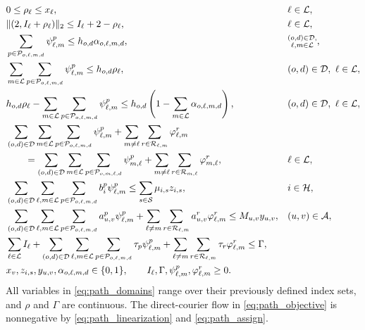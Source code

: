\documentclass[final,3p,authoryear]{elsarticle}
\begin{document}
\begin{subequations}
\begin{align}
 &0\le\rho_\ell\le x_\ell,
 &&\ell\in\mathcal L,\label{eq:path_rho}\\
 &\|(2,I_\ell+\rho_\ell)\|_2\le I_\ell+2-\rho_\ell,
 &&\ell\in\mathcal L,\label{eq:path_full_cone}\\
 &\sum_{p\in\mathcal P_{o,\ell,m,d}}\psi_{\ell,m}^{p}
 \le h_{o,d}\alpha_{o,\ell,m,d},
 &&\substack{(o,d)\in\mathcal D,\\\ell,m\in\mathcal L},\label{eq:path_full_pair}\\
 &\sum_{m\in\mathcal L}\sum_{p\in\mathcal P_{o,\ell,m,d}}\psi_{\ell,m}^{p}
 \le h_{o,d}\rho_\ell,
 &&(o,d)\in\mathcal D,\ \ell\in\mathcal L,\label{eq:path_full_source_upper}\\
 &h_{o,d}\rho_\ell-
 \sum_{m\in\mathcal L}\sum_{p\in\mathcal P_{o,\ell,m,d}}\psi_{\ell,m}^{p}
 \le h_{o,d}\left(1-\sum_{m\in\mathcal L}\alpha_{o,\ell,m,d}\right),
 &&(o,d)\in\mathcal D,\ \ell\in\mathcal L,\label{eq:path_full_source_lower}\\
 &\sum_{(o,d)\in\mathcal D}\sum_{m\in\mathcal L}
  \sum_{p\in\mathcal P_{o,\ell,m,d}}\psi_{\ell,m}^{p}
 +\sum_{m\ne\ell}\sum_{r\in\mathcal R_{\ell,m}}\varphi_{\ell,m}^{r}\notag\\
 &\qquad=\sum_{(o,d)\in\mathcal D}\sum_{m\in\mathcal L}
  \sum_{p\in\mathcal P_{o,m,\ell,d}}\psi_{m,\ell}^{p}
 +\sum_{m\ne\ell}\sum_{r\in\mathcal R_{m,\ell}}\varphi_{m,\ell}^{r},
 &&\ell\in\mathcal L,\label{eq:path_balance}\\
 &\sum_{(o,d)\in\mathcal D}\sum_{\ell,m\in\mathcal L}
  \sum_{p\in\mathcal P_{o,\ell,m,d}}b_i^p\psi_{\ell,m}^{p}
 \le\sum_{s\in\mathcal S}\mu_{i,s}z_{i,s},
 &&i\in\mathcal H,\label{eq:path_capacity}\\
 &\sum_{(o,d)\in\mathcal D}\sum_{\ell,m\in\mathcal L}
  \sum_{p\in\mathcal P_{o,\ell,m,d}}a_{u,v}^p\psi_{\ell,m}^{p}
 +\sum_{\ell\ne m}\sum_{r\in\mathcal R_{\ell,m}}a_{u,v}^r\varphi_{\ell,m}^{r}
 \le M_{u,v} y_{u,v},
 &&(u,v)\in\mathcal A,\label{eq:path_activation}\\
 &\sum_{\ell\in\mathcal L}I_\ell
 +\sum_{(o,d)\in\mathcal D}\sum_{\ell,m\in\mathcal L}
 \sum_{p\in\mathcal P_{o,\ell,m,d}}\tau_p\psi_{\ell,m}^{p}
 +\sum_{\ell\ne m}\sum_{r\in\mathcal R_{\ell,m}}\tau_r\varphi_{\ell,m}^{r}
 \le\Gamma,\label{eq:path_full_fleet}\\
 &x_v,z_{i,s},y_{u,v},\alpha_{o,\ell,m,d}\in\{0,1\},
 \qquad I_\ell,\Gamma,\psi_{\ell,m}^{p},\varphi_{\ell,m}^{r}\ge0.
 \label{eq:path_domains}
\end{align}
\end{subequations}
All variables in \eqref{eq:path_domains} range over their previously defined index sets, and $\rho$ and $\Gamma$ are continuous.
The direct-courier flow in \eqref{eq:path_objective} is nonnegative by \eqref{eq:path_linearization} and \eqref{eq:path_assign}.
\end{document}
